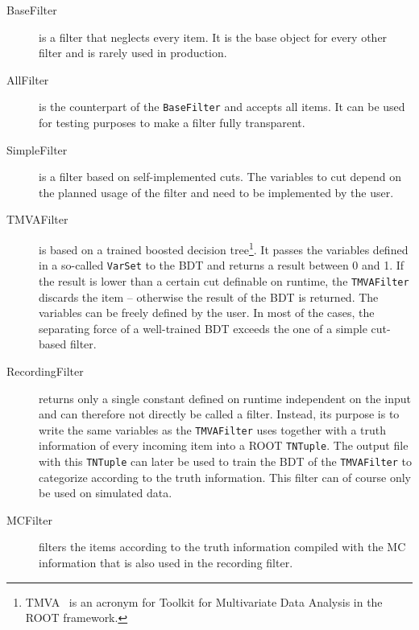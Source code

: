 \begin{description}
  \item[BaseFilter] is a filter that neglects every item. It is the base object for every other filter and is rarely used in production.
  \item[AllFilter] is the counterpart of the \texttt{BaseFilter} and accepts all items. It can be used for testing purposes to make a filter fully transparent.
  \item[SimpleFilter] is a filter based on self-implemented cuts. The variables to cut depend on the planned usage of the filter and need to be implemented by the user.
  \item[TMVAFilter] is based on a trained boosted decision tree\footnote{TMVA~\cite{tmva} is an acronym for Toolkit for Multivariate Data Analysis in the ROOT framework.}. It passes the variables defined in a so-called \texttt{VarSet} to the BDT and returns a result between 0 and 1. If the result is lower than a certain cut definable on runtime, the \texttt{TMVAFilter} discards the item -- otherwise the result of the BDT is returned. The variables can be freely defined by the user. In most of the cases, the separating force of a well-trained BDT exceeds the one of a simple cut-based filter.
  \item[RecordingFilter] returns only a single constant defined on runtime independent on the input and can therefore not directly be called a filter. Instead, its purpose is to write the same variables as the \texttt{TMVAFilter} uses together with a truth information of every incoming item into a ROOT \texttt{TNTuple}. The output file with this \texttt{TNTuple} can later be used to train the BDT of the \texttt{TMVAFilter} to categorize according to the truth information. This filter can of course only be used on simulated data.
  \item[MCFilter] filters the items according to the truth information compiled with the MC information that is also used in the recording filter.
\end{description}

